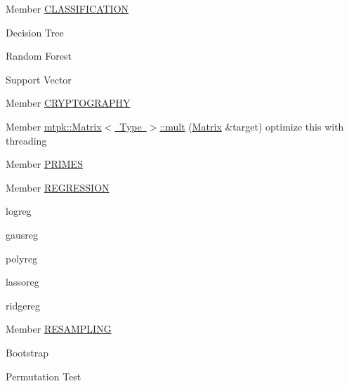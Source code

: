 
\begin{DoxyRefList}
\item[Member \mbox{\hyperlink{ml_8hpp_a669750181416ae68a4b4684e5006f733}{CLASSIFICATION}} ]\label{todo__todo000003}%
%

\begin{DoxyItemize}
\item Decision Tree
\item Random Forest
\item Support Vector  
\end{DoxyItemize}
\item[Member \mbox{\hyperlink{nt_8hpp_a7e35c8ec7ddf6c921ac513fdea803509}{CRYPTOGRAPHY}} ]\label{todo__todo000006}%
%
  
\item[Member \mbox{\hyperlink{classmtpk_1_1Matrix_aaf09c65a0c5214525caf887405a522fc}{mtpk\+::Matrix\texorpdfstring{$<$}{<} Type \texorpdfstring{$>$}{>}\+::mult}} (\mbox{\hyperlink{classmtpk_1_1Matrix}{Matrix}} \&target)]\label{todo__todo000001}%
%
optimize this with threading  
\item[Member \mbox{\hyperlink{nt_8hpp_a48293241e70c61f3645fc82a34b6c75e}{PRIMES}} ]\label{todo__todo000005}%
%
  
\item[Member \mbox{\hyperlink{ml_8hpp_a8b483716c17fe4c5365714ca8582da43}{REGRESSION}} ]\label{todo__todo000002}%
%

\begin{DoxyItemize}
\item logreg
\item gausreg
\item polyreg
\item lassoreg
\item ridgereg  
\end{DoxyItemize}
\item[Member \mbox{\hyperlink{ml_8hpp_ae1704ccaaf93f8f9a83c8712bf0cf4aa}{RESAMPLING}} ]\label{todo__todo000004}%
%

\begin{DoxyItemize}
\item Bootstrap
\item Permutation Test 
\end{DoxyItemize}
\end{DoxyRefList}